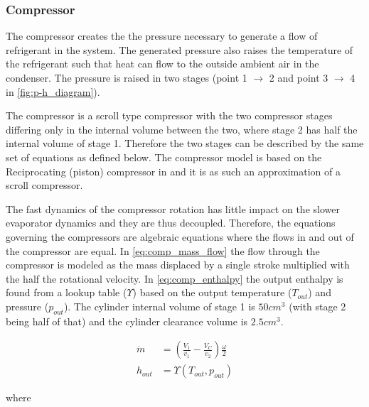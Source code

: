 \subsubsection{Compressor}
The compressor creates the the pressure necessary to generate a flow of refrigerant in the system. The generated pressure also raises the temperature of the refrigerant such that heat can flow to the outside ambient air in the condenser. The pressure is raised in two stages (point 1 $\rightarrow$ 2 and point 3 $\rightarrow$ 4 in \cref{fig:p-h_diagram}).

The compressor is a scroll type compressor with the two compressor stages differing only in the internal volume between the two, where stage 2 has half the internal volume of stage 1. Therefore the two stages can be described by the same set of equations as defined below. The compressor model is based on the Reciprocating (piston) compressor in \cite{Sorensen2013} and it is as such an approximation of a scroll compressor. 

The fast dynamics of the compressor rotation has little impact on the slower evaporator dynamics and they are thus decoupled. Therefore, the equations governing the compressors are algebraic equations where the flows in and out of the compressor are equal. In \cref{eq:comp_mass_flow} the flow through the compressor is modeled as the mass displaced by a single stroke multiplied with the half the rotational velocity. In \cref{eq:comp_enthalpy} the output enthalpy is found from a lookup table ($ \Upsilon $) based on the output temperature ($T_{out}$) and pressure ($p_{out}$). The cylinder internal volume of stage 1 is $50cm^3$ (with stage 2 being half of that) and the cylinder clearance volume is $2.5cm^3$.

\begin{align}
	\dot{m} &= \left(\frac{V_1}{v_1} - \frac{V_C}{v_2}\right) \frac{\omega}{2} \label{eq:comp_mass_flow} \\
	h_{out} &= \Upsilon(T_{out}, p_{out}) \label{eq:comp_enthalpy}
\end{align}

where

